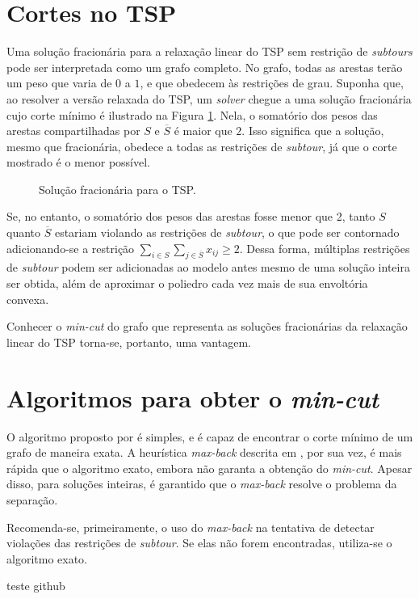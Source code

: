 \section{Cortes no TSP}
Uma solução fracionária para a relaxação linear do TSP sem restrição de \textit{subtours} pode ser interpretada como um grafo completo. No grafo, todas as arestas terão um peso que varia de \(0\) a \(1\), e que obedecem às restrições de grau.
Suponha que, ao resolver a versão relaxada do TSP,  um \textit{solver} chegue a uma solução fracionária cujo corte mínimo é ilustrado na Figura \ref{fig:solucaoFrac}. Nela, o somatório dos pesos das arestas compartilhadas por \(S\) e \(\overline{S}\) é maior que \(2\). Isso significa que a solução, mesmo que fracionária, obedece a todas as restrições de \textit{subtour}, já que o corte mostrado é o menor possível. 

\begin{figure}[h]
    \caption{Solução fracionária para o TSP.}
    \label{fig:solucaoFrac}
\end{figure}

Se, no entanto, o somatório dos pesos das arestas fosse menor que 2, tanto \(S\) quanto \(\overline{S}\) estariam violando as restrições de \textit{subtour}, o que pode ser contornado adicionando-se a restrição \(\sum_{i \in S}\sum_{j \in \overline{S}}x_{ij} \geq 2\). Dessa forma, múltiplas restrições de \textit{subtour} podem ser adicionadas ao modelo antes mesmo de uma solução inteira ser obtida, além de aproximar o poliedro cada vez mais de sua envoltória convexa.

Conhecer o \textit{min-cut} do grafo que representa as soluções fracionárias da relaxação linear do TSP torna-se, portanto, uma vantagem.

\section{Algoritmos para obter o \textit{min-cut}}
O algoritmo proposto por \cite{Stoer:1997:SMA:263867.263872} é simples, e é capaz de encontrar o corte mínimo de um grafo de maneira exata. A heurística \textit{max-back} descrita em \cite{denisnaddef}, por sua vez, é mais rápida que o algoritmo exato, embora não garanta a obtenção do \textit{min-cut}. Apesar disso, para soluções inteiras, é garantido que o \textit{max-back} resolve o problema da separação.

Recomenda-se, primeiramente, o uso do \textit{max-back} na tentativa de detectar violações das restrições de \textit{subtour}. Se elas não forem encontradas, utiliza-se o algoritmo exato.

{ \color{blue} teste github }

